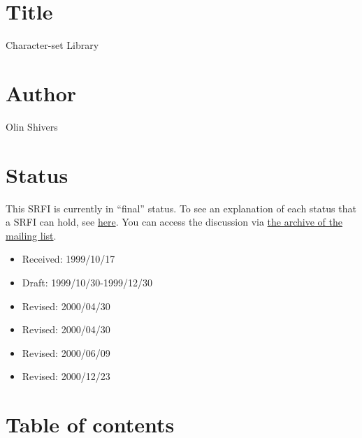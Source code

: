 \section{Title}\label{title}

Character-set Library

\section{Author}\label{author}

Olin Shivers

\section{Status}\label{status}

This SRFI is currently in ``final'' status. To see an explanation of
each status that a SRFI can hold, see
\href{http://srfi.schemers.org/srfi-process.html}{here}. You can access
the discussion via \href{mail-archive/maillist.html}{the archive of the
mailing list}.

\begin{itemize}
\tightlist
\item
  Received: 1999/10/17
\item
  Draft: 1999/10/30-1999/12/30
\item
  Revised: 2000/04/30
\item
  Revised: 2000/04/30
\item
  Revised: 2000/06/09
\item
  Revised: 2000/12/23
\end{itemize}

\section{Table of contents}\label{table-of-contents}

